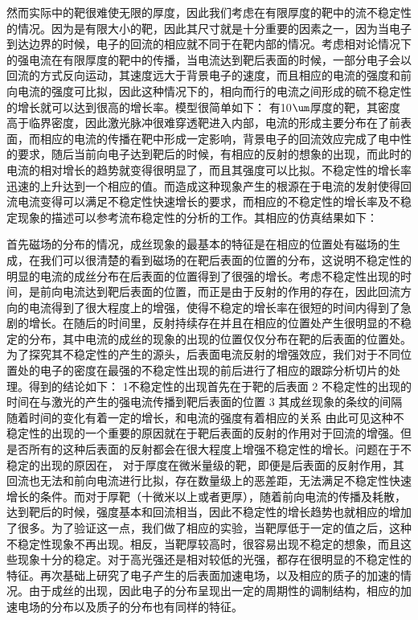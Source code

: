 然而实际中的靶很难使无限的厚度，因此我们考虑在有限厚度的靶中的流不稳定性的情况。因为是有限大小的靶，因此其尺寸就是十分重要的因素之一，因为当电子到达边界的时候，电子的回流的相应就不同于在靶内部的情况。考虑相对论情况下的强电流在有限厚度的靶中的传播，当电流达到靶后表面的时候，一部分电子会以回流的方式反向运动，其速度远大于背景电子的速度，而且相应的电流的强度和前向电流的强度可比拟，因此这种情况下的，相向而行的电流之间形成的硫不稳定性的增长就可以达到很高的增长率。模型很简单如下： 有10$\um$厚度的靶，其密度高于临界密度，因此激光脉冲很难穿透靶进入内部，电流的形成主要分布在了前表面，而相应的电流的传播在靶中形成一定影响，背景电子的回流效应完成了电中性的要求，随后当前向电子达到靶后的时候，有相应的反射的想象的出现，而此时的电流的相对增长的趋势就变得很明显了，而且其强度可以比拟。不稳定性的增长率迅速的上升达到一个相应的值。而造成这种现象产生的根源在于电流的发射使得回流电流变得可以满足不稳定性快速增长的要求，而相应的不稳定性的增长率及不稳定现象的描述可以参考流布稳定性的分析的工作。其相应的仿真结果如下：

首先磁场的分布的情况，成丝现象的最基本的特征是在相应的位置处有磁场的生成，在我们可以很清楚的看到磁场的在靶后表面的位置的分布，这说明不稳定性的明显的电流的成丝分布在后表面的位置得到了很强的增长。考虑不稳定性出现的时间，是前向电流达到靶后表面的位置，而正是由于反射的作用的存在，因此回流方向的电流得到了很大程度上的增强，使得不稳定的增长率在很短的时间内得到了急剧的增长。在随后的时间里，反射持续存在并且在相应的位置处产生很明显的不稳定的分布，其中电流的成丝的现象的出现的位置仅仅分布在靶的后表面的位置处。为了探究其不稳定性的产生的源头，后表面电流反射的增强效应，我们对于不同位置处的电子的密度在最强的不稳定性出现的前后进行了相应的跟踪分析切片的处理。得到的结论如下：
1不稳定性的出现首先在于靶的后表面
2 不稳定性的出现的时间在与激光的产生的强电流传播到靶后表面的位置
3 其成丝现象的条纹的间隔随着时间的变化有着一定的增长，和电流的强度有着相应的关系
由此可见这种不稳定性的出现的一个重要的原因就在于靶后表面的反射的作用对于回流的增强。但是否所有的这种后表面的反射都会在很大程度上增强不稳定性的增长。问题在于不稳定的出现的原因在， 对于厚度在微米量级的靶，即便是后表面的反射作用，其回流也无法和前向电流进行比拟，存在数量级上的恶差距，无法满足不稳定性快速增长的条件。而对于厚靶（十微米以上或者更厚），随着前向电流的传播及耗散，达到靶后的时候，强度基本和回流相当，因此不稳定性的增长趋势也就相应的增加了很多。为了验证这一点，我们做了相应的实验，当靶厚低于一定的值之后，这种不稳定性现象不再出现。相反，当靶厚较高时，很容易出现不稳定的想象，而且这些现象十分的稳定。对于高光强还是相对较低的光强，都存在很明显的不稳定性的特征。再次基础上研究了电子产生的后表面加速电场，以及相应的质子的加速的情况。由于成丝的出现，因此电子的分布呈现出一定的周期性的调制结构，相应的加速电场的分布以及质子的分布也有同样的特征。
